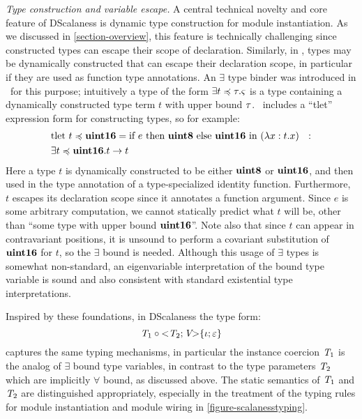 \emph{Type construction and variable escape.} A central technical novelty and core feature of
DScalaness is dynamic type construction for module instantiation. As we discussed in
\autoref{section-overview}, this feature is technically challenging since constructed types can
escape their scope of declaration. Similarly, in \fml, types may be dynamically constructed that
can escape their declaration scope, in particular if they are used as function type annotations.
An $\exists$ type binder was introduced in \fml\ for this purpose; intuitively a type of the
form $\exists t \preccurlyeq \tau . \varsigma$ is a type containing a dynamically constructed type term $t$
with upper bound $\tau$. \fml\ includes a ``tlet'' expression form for constructing types, so for
example:
\begin{eqnarray*}
&\text{tlet\ } t \preccurlyeq \textbf{uint16} = \text{if }e \text{ then } \textbf{uint8} \text{ else } \textbf{uint16} 
\text{\ in\ }(\lambda x : t . x) \ \ : \\
&\exists t \preccurlyeq \textbf{uint16} . t \rightarrow t
\end{eqnarray*}
Here a type $t$ is dynamically constructed to be either $\textbf{uint8}$ or $\textbf{uint16}$, and then used
in the type annotation of a type-specialized identity function. Furthermore, $t$ escapes its
declaration scope since it annotates a function argument. Since $e$ is some arbitrary
computation, we cannot statically predict what $t$ will be, other than ``some type with upper
bound $\textbf{uint16}$''. Note also that since $t$ can appear in contravariant positions, it is
unsound to perform a covariant substitution of $\textbf{uint16}$ for $t$, so the $\exists$ bound is
needed. Although this usage of $\exists$ types is somewhat non-standard, an eigenvariable
interpretation of the bound type variable is sound and also consistent with standard existential
type interpretations.

Inspired by these foundations, in DScalaness the type form:
$$
\textit{T}_1 \circ \mathrm{<}\textit{T}_2;\textit{V}\mathrm{>}\{\iota;
  \varepsilon\}
$$ 
captures the same typing mechanisms, in particular the instance coercion $\textit{T}_1$ is the
analog of $\exists$ bound type variables, in contrast to the type parameters $\textit{T}_2$ which
are implicitly $\forall$ bound, as discussed above. The static semantics of $\textit{T}_1$ and
$\textit{T}_2$ are distinguished appropriately, especially in the treatment of the typing rules for
module instantiation and module wiring in \autoref{figure-scalanesstyping}.

